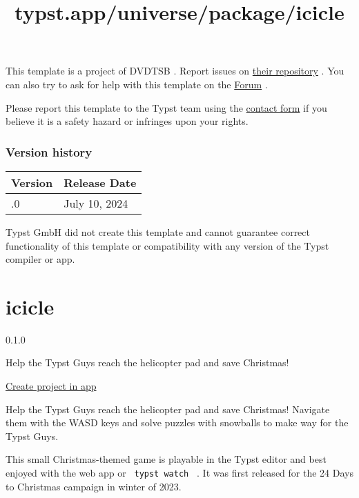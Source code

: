 This template is a project of DVDTSB . Report issues on
\href{https://github.com/DVDTSB/dvdtyp}{their repository} . You can also
try to ask for help with this template on the
\href{https://forum.typst.app}{Forum} .

Please report this template to the Typst team using the
\href{https://typst.app/contact}{contact form} if you believe it is a
safety hazard or infringes upon your rights.

\label{versions}
\subsubsection{Version history}\label{version-history}

\begin{longtable}[]{@{}ll@{}}
\toprule\noalign{}
Version & Release Date \\
\midrule\noalign{}
\endhead
\bottomrule\noalign{}
\endlastfoot
1.0.0 & July 10, 2024 \\
\end{longtable}

Typst GmbH did not create this template and cannot guarantee correct
functionality of this template or compatibility with any version of the
Typst compiler or app.


\title{typst.app/universe/package/icicle}

\label{banner}
\label{template-thumbnail}

\section{icicle}\label{icicle}

{ 0.1.0 }

Help the Typst Guys reach the helicopter pad and save Christmas!

\href{/app?template=icicle&version=0.1.0}{Create project in app}

\label{readme}
Help the Typst Guys reach the helicopter pad and save Christmas!
Navigate them with the WASD keys and solve puzzles with snowballs to
make way for the Typst Guys.

This small Christmas-themed game is playable in the Typst editor and
best enjoyed with the web app or \texttt{\ typst\ watch\ } . It was
first released for the 24 Days to Christmas campaign in winter of 2023.

